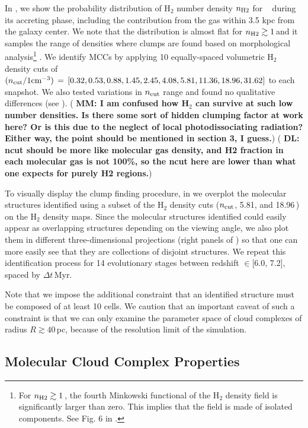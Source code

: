 \IfFileExists{emulateapjlegacy.cls}{\documentclass[iop]{emulateapjlegacy}}{\documentclass[iop]{emulateapj}}
\newcommand{\DL}[1]{({\bf \color{dlcolor} DL: #1})}
\newcommand{\MM}[1]{({\bf \color{mmcolor} MM: #1})}
\begin{document}
In , we show the probability distribution of H$_2$
number density $n_{\rm H2}$ for \flower~ during its accreting phase,
including the contribution from the gas within 3.5 kpc from the
galaxy center. 
%
We note that the distribution is almost flat for $n_{\rm
  H2}\gtrsim1$\,\cc and it samples the range of densities where clumps
are found based on morphological analysis\footnote{For $n_{\rm
    H2}\gtrsim1$\,\cc, the fourth Minkowski functional of the H$_{2}$
  density field is significantly larger than zero. This implies that
  the field is made of isolated components. See Fig. 6 in
  \citet{Pallottini17b}.} \citep{Pallottini17b}. We identify MCCs by
applying 10 equally-spaced volumetric H$_2$ density cuts of ${(n_{\rm
    cut}/{1 {\rm cm}^{-3})}}\,=\,[0.32, 0.53, 0.88, 1.45, 2.45, 4.08,
5.81, 11.36, 18.96, 31.62]$ to each snapshot. 
We also tested variations in
  $n_{\rm cut}$ range and found no qualitative differences (see
  ).
\MM{I am confused how H$_2$ can survive at such low number
  densities.  Is there some sort of hidden clumping factor at work
  here? Or is this due to the neglect of local photodissociating
  radiation? Either way, the point should be mentioned in section 3, I
guess.}
\DL{ncut should be more like molecular gas density, and H2 fraction in each molecular gas is not 100\%, so the ncut here are lower than
 what one expects for purely H2 regions.}

To visually display 
the clump finding procedure, in  we overplot the molecular structures identified using a subset of the H$_2$ density cuts ($n_{\rm cut}$, 5.81, and 18.96\,\cc) on the H$_2$ density maps.
Since the molecular structures identified could easily appear as overlapping structures depending on the viewing angle, we also plot them in different three-dimensional projections (right panels of ) so that one can more easily see that they are collections of disjoint structures.
%
We repeat this identification process for 14 evolutionary stages between redshift \z$\in$[6.0, 7.2], spaced by $\Delta t$\,Myr.

Note that we impose the additional constraint that an identified
structure must be composed of at least 10 cells. We caution that an
important caveat of such a constraint is that we can only examine the
parameter space of cloud complexes of 
radius $R\gtrsim 40$\,pc,
because of the resolution limit of the simulation.

\subsection{Molecular Cloud Complex Properties}
\end{document}
